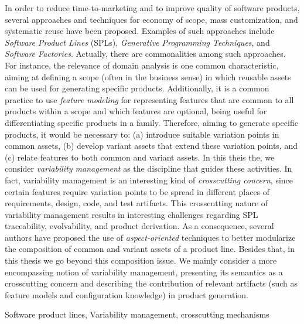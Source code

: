 \abstract
In order to reduce time-to-marketing and to improve quality of software products,
several approaches and techniques for economy of scope, mass customization, and
systematic reuse have been proposed. Examples of such approaches include
\emph{Software Product Lines} (SPLs), \emph{Generative Programming Techniques},
and \emph{Software Factories}. Actually, there are commonalities among such
approaches. For instance, the relevance of domain analysis is one common
characteristic, aiming at defining a scope (often in the business sense) in which
reusable assets can be used for generating specific products. Additionally, 
it is a common practice to use \emph{feature modeling} for
representing features that are common to all products within a scope and which
features are optional, being useful for differentiating specific products in a
family. Therefore, aiming to generate specific products, it would be necessary
to: (a) introduce suitable variation points in common assets, (b) develop variant
assets that extend these variation points, and (c) relate features to both common
and variant assets.  In this theis the, we consider \emph{variability
management} as the discipline that guides these activities. In fact, variability management is
an interesting kind of \emph{crosscutting concern}, since certain features
require variation points to be spread in different places of requirements, design, code,
and test artifacts. This crosscutting nature of variability management results in
interesting challenges regarding SPL traceability, evolvability, and product
derivation. As a consequence, several authors have proposed the use of
\emph{aspect-oriented} techniques to better modularize the composition of common
and variant assets of a product line. Besides that, in this thesis we go beyond this composition issue. We mainly consider a 
more encompassing notion of variability management, presenting its semantics as a crosscutting 
concern and describing the contribution of relevant artifacts (such as feature models and
configuration knowledge) in product generation.
\begin{keywords}
Software product lines, Variability management, crosscutting mechanisms
\end{keywords}
